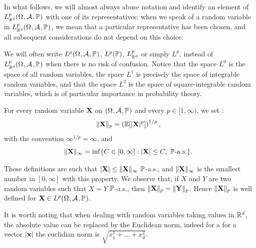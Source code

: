 \documentclass[../Main.tex]{subfiles}
\begin{document}
In what follows, we will almost always abuse notation and identify an element of $L^p_{\mathbb{R}^d}(\Omega_{}, \mathcal{A}_{}, \mathbb{P}_{})$ with one of its representatives: when we speak of a random variable in $L^p_{\mathbb{R}^d}(\Omega_{}, \mathcal{A}_{}, \mathbb{P}_{})$, we mean that a particular representative has been chosen, and all subsequent considerations do not depend on this choice.

We will often write $L^p(\Omega_{}, \mathcal{A}_{}, \mathbb{P}_{})$, $L^p(\mathbb{P})$, $L^p_{\mathbb{R}^d}$ or simply $L^p$, instead of $L^p_{\mathbb{R}^d}(\Omega_{}, \mathcal{A}_{}, \mathbb{P}_{})$ when there is no risk of confusion. Notice that the space $L^0$ is the space of all random variables, the space $L^1$ is precisely the space of integrable random variables, and that the space $L^2$ is the space of square-integrable random variables, which is of particular importance in probability theory.

For every random variable $\mathbf{X}$ on $(\Omega_{}, \mathcal{A}_{}, \mathbb{P}_{})$ and every $p\in[1,\infty)$, we set : 
\[ \|\mathbf{X}\|_p = \left(\mathbb{E}\!\left[|\mathbf{X}|^p\right]\right)^{1/p}, \]
with the convention $\infty^{1/p}=\infty$, and
\[ \|\mathbf{X}\|_\infty = \inf\{C\in[0,\infty] : |\mathbf{X}|\le C,\ \mathbb{P}\text{-a.s.}\}. \]

These definitions are such that $|\mathbf{X}|\le\|\mathbf{X}\|_\infty$ $\mathbb{P}$-a.s., and $\|\mathbf{X}\|_\infty$ is the smallest number in $[0,\infty]$ with this property. We observe that, if $X$ and $Y$ are two random variables such that $X=Y$ $\mathbb{P}$-a.s., then $\|\mathbf{X}\|_p=\|\mathbf{Y}\|_p$. Hence $\|\mathbf{X}\|_p$ is well defined for $\mathbf{X}\in L^p(\Omega_{}, \mathcal{A}_{}, \mathbb{P}_{})$.

It is worth noting that when dealing with random variables taking values in $\mathbb{R}^d$, the absolute value can be replaced by the Euclidean norm, indeed for a for a vector  $|\mathbf{x}|$ the euclidian norm is $\sqrt{x_1^1+...+x_d^2}$.
\end{document}
